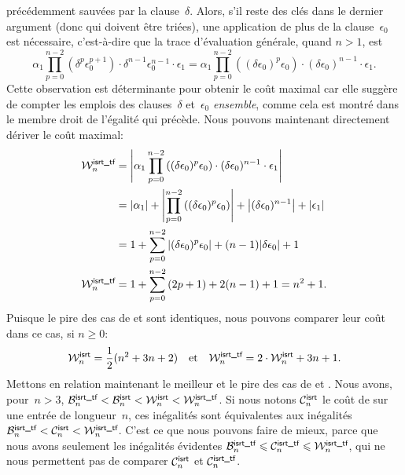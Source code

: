 précédemment sauvées par la clause~\(\delta\). Alors, s'il reste des
clés dans le dernier argument (donc qui doivent être triées), une
application de plus de la clause~\(\epsilon_0\) est nécessaire,
c'est-à-dire que la trace d'évaluation générale, quand \(n > 1\), est
\begin{equation*}
\alpha_1\prod_{p=0}^{n-2}{\left(\delta^p\epsilon_0^{p+1}\right)} \cdot
\delta^{n-1}\epsilon_0^{n-1} \cdot \epsilon_1
= \alpha_1\prod_{p=0}^{n-2}{\left((\delta\epsilon_0)^p\epsilon_0\right)}
\cdot (\delta\epsilon_0)^{n-1} \cdot \epsilon_1.
\end{equation*}
Cette observation est déterminante pour obtenir le coût maximal car
elle suggère de compter les emplois des clauses~\(\delta\)
et~\(\epsilon_0\) \emph{ensemble}, comme cela est montré dans le
membre droit de l'égalité qui précède. Nous pouvons maintenant
directement dériver le coût maximal:
\begin{align*}
  \W{\fun{isrt\_tf}}{n}
  &= \left|\alpha_1\prod_{p=0}^{n-2}{\left((\delta\epsilon_0)^p\epsilon_0\right)}
     \cdot (\delta\epsilon_0)^{n-1} \cdot \epsilon_1\right|\\
  &= \len{\alpha_1} +
     \left|\prod_{p=0}^{n-2}{\left((\delta\epsilon_0)^p\epsilon_0\right)}\right|
     + \left|(\delta\epsilon_0)^{n-1}\right| + \len{\epsilon_1}\\
  &= 1 + \sum_{p=0}^{n-2}{\left|(\delta\epsilon_0)^p\epsilon_0\right|}
     + (n-1)\len{\delta\epsilon_0} + 1\\
\W{\fun{isrt\_tf}}{n}
  &= 1 + \sum_{p=0}^{n-2}{(2p+1)} + 2(n-1) + 1 = n^2 + 1.
\end{align*}
Puisque le pire des cas de  et 
sont identiques, nous pouvons comparer leur coût dans ce cas, si
\(n\geqslant{}0\):
\begin{equation*}
\W{\fun{isrt}}{n} = \frac{1}{2}(n^2 + 3n + 2)
\quad\text{et}\quad
\W{\fun{isrt\_tf}}{n} = 2 \cdot \W{\fun{isrt}}{n}  + 3n + 1.
\end{equation*}
Mettons en relation maintenant le meilleur et le pire des cas de
 et . Nous avons, pour~\(n>3\),
\(\B{\smash[t]{\fun{isrt\_tf}}}{n} < \B{\fun{isrt}}{n} <
\W{\fun{isrt}}{n} < \W{\smash[t]{\fun{isrt\_tf}}}{n}\). Si nous notons
\(\C{\fun{isrt}}{n}\) le coût de  sur une entrée de
longueur~\(n\), ces inégalités sont équivalentes aux inégalités \(
\B{\smash[t]{\fun{isrt\_tf}}}{n} < \C{\fun{isrt}}{n} <
\W{\smash[t]{\fun{isrt\_tf}}}{n}\).  C'est ce que nous pouvons faire
de mieux, parce que nous avons seulement les inégalités évidentes
\(\B{\smash[t]{\fun{isrt\_tf}}}{n} \leqslant
\C{\smash[t]{\fun{isrt\_tf}}}{n} \leqslant
\W{\smash[t]{\fun{isrt\_tf}}}{n}\), qui ne nous permettent pas de
comparer \(\C{\fun{isrt}}{n}\) et
\(\C{\smash[t]{\fun{isrt\_tf}}}{n}\).

